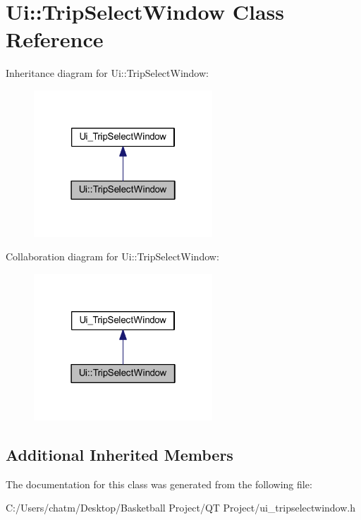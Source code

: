 \hypertarget{class_ui_1_1_trip_select_window}{}\section{Ui\+::Trip\+Select\+Window Class Reference}
\label{class_ui_1_1_trip_select_window}


Inheritance diagram for Ui\+::Trip\+Select\+Window\+:\nopagebreak
\begin{figure}[H]
\begin{center}
\leavevmode
\includegraphics[width=190pt]{class_ui_1_1_trip_select_window__inherit__graph}
\end{center}
\end{figure}


Collaboration diagram for Ui\+::Trip\+Select\+Window\+:\nopagebreak
\begin{figure}[H]
\begin{center}
\leavevmode
\includegraphics[width=190pt]{class_ui_1_1_trip_select_window__coll__graph}
\end{center}
\end{figure}
\subsection*{Additional Inherited Members}


The documentation for this class was generated from the following file\+:\begin{DoxyCompactItemize}
\item 
C\+:/\+Users/chatm/\+Desktop/\+Basketball Project/\+Q\+T Project/ui\+\_\+tripselectwindow.\+h\end{DoxyCompactItemize}
